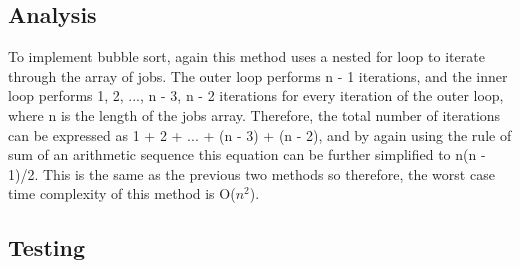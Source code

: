 \documentclass[12pt,a4paper]{article}
\begin{document}
		\subsection{Analysis}
			To implement bubble sort, again this method uses a nested for loop to iterate through the array of 
			jobs. The outer loop performs n - 1 iterations, and the inner loop performs 1, 2, ..., n - 3, n - 2 
			iterations for every iteration of the outer loop, where n is the length of the jobs array. Therefore, 
			the total number of iterations can be expressed as 1 + 2 + ... + (n - 3) + (n - 2), and by again 
			using the rule of sum of an arithmetic sequence this equation can be further simplified to n(n - 1)/2. 
			This is the same as the previous two methods so therefore, the worst case time complexity of this 
			method is O($n ^ 2$).\\

		\subsection{Testing}
\end{document}

